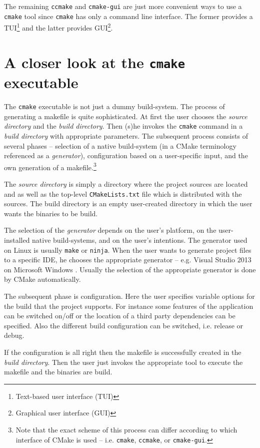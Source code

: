 \documentclass[12pt,oneside]{fithesis2}
\begin{document}
The remaining \texttt{ccmake} and \texttt{cmake-gui} are just more convenient ways to use a \texttt{cmake} tool since \texttt{cmake} has only a command line interface. The former provides a TUI\footnote{Text-based user interface (TUI)} and the latter provides GUI\footnote{Graphical user interface (GUI)}.

\section{A closer look at the \texttt{cmake} executable}

The \texttt{cmake} executable is not just a dummy build-system. The process of generating a makefile is quite sophisticated. At first the user chooses the \emph{source directory} and the \emph{build directory}. Then (s)he invokes the \texttt{cmake} command in a \emph{build directory} with appropriate parameters. The subsequent process consists of several phases -- selection of a native build-system (in a CMake terminology referenced as a \emph{generator}), configuration based on a user-specific input, and the own generation of a makefile.\footnote{Note that the exact scheme of this process can differ according to which interface of CMake is used -- i.e. \texttt{cmake}, \texttt{ccmake}, or \texttt{cmake-gui}.}

The \emph{source directory} is simply a directory where the project sources are located and as well as the top-level \texttt{CMakeLists.txt} file which is distributed with the sources. The build directory is an empty user-created directory in which the user wants the binaries to be build.

The selection of the \emph{generator} depends on the user's platform, on the user-installed native build-systems, and on the user's intentions. The generator used on Linux is usually \texttt{make} or \texttt{ninja}. When the user wants to generate project files to a specific IDE, he chooses the appropriate generator -- e.g. Visual Studio 2013 \cite{msvc} on Microsoft Windows \cite{win}. Usually the selection of the appropriate generator is done by CMake automatically.

The subsequent phase is configuration. Here the user specifies variable options for the build that the project supports. For instance some features of the application can be switched on/off or the location of a third party dependencies can be specified. Also the different build configuration can be switched, i.e. release or debug.

If the configuration is all right then the makefile is successfully created in the \emph{build directory}. Then the user just invokes the appropriate tool to execute the makefile and the binaries are build.
\end{document}
